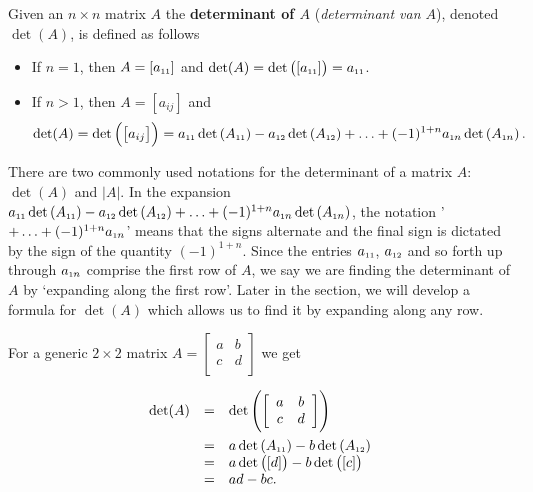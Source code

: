 \begin{definition} \label{determinantdefn}   
Given an $n \times n$ matrix $A$ the \textbf{determinant of \boldmath $A$} (\textit{determinant van $A$}), denoted $\det(A)$, is defined as follows
		
\begin{itemize}	
	\item  If $n=1$, then $A = \left[ a_{\mbox{\tiny$11$}} \right]$ and $\det(A) = \det\left( \left[ a_{\mbox{\tiny$11$}} \right] \right) = a_{\mbox{\tiny$11$}}$.
			
	\item  If $n>1$, then $A = \left[ a_{ij} \right]$ and \[ \det(A) = \det\left( \left[ a_{ij} \right] \right) =  a_{\mbox{\tiny$11$}} \det\left(A_{\mbox{\tiny$11$}}\right)- a_{\mbox{\tiny$12$}} \det\left(A_{\mbox{\tiny$12$}}\right) +  \ldots  + (-1)^{1+n} a_{\mbox{\tiny$1$}n} \det\left(A_{\mbox{\tiny$1$}n}\right).\]
			
\end{itemize}
		
\end{definition}


\smallskip

There are two commonly used notations for the determinant of a matrix $A$: $\det(A)$ and $|A|$.
In the expansion $a_{\mbox{\tiny$11$}} \det\left(A_{\mbox{\tiny$11$}}\right)- a_{\mbox{\tiny$12$}} \det\left(A_{\mbox{\tiny$12$}}\right) +  \ldots  + (-1)^{1+n} a_{\mbox{\tiny$1$}n} \det\left(A_{\mbox{\tiny$1$}n}\right)$, the notation '$+  \ldots  + (-1)^{1+n} a_{\mbox{\tiny$1$}n}$' means that the signs alternate and the final sign is dictated by the sign of the quantity $(-1)^{1+n}$. Since the entries $a_{\mbox{\tiny$11$}}$, $a_{\mbox{\tiny$12$}}$ and so forth up through $a_{\mbox{\tiny$1$}n}$ comprise the first row of $A$, we say we are finding the determinant of $A$  by `expanding along the first row'. Later in the section, we will develop a formula for $\det(A)$ which allows us to find it by expanding along any row.

\smallskip

For a generic $2 \times 2$ matrix $A = \left[ \begin{array}{cc} a & b \\ c & d \\ \end{array} \right]$ we get

\[ \begin{array}{rcl} 

\det(A) & = & \det \left( \left[ \begin{array}{cc}  a & b \\ c & d \\ \end{array} \right] \right)\\[13pt]
& = &  a \det\left(A_{\mbox{\tiny$11$}}\right) - b \det\left(A_{\mbox{\tiny$12$}}\right) \\
& = &  a \det\left(\left[ d \right]\right) - b \det\left(\left[c \right]\right) \\
& = & ad-bc. \end{array}\]

